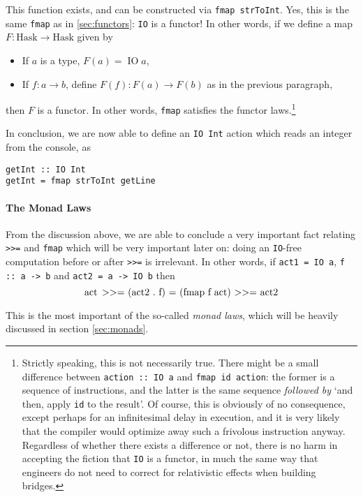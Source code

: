 \documentclass[11pt]{article}
\theoremstyle{nonumberplain}
\newcommand{\Hask}{\mathrm{Hask}}
\newcommand{\typecons}[1]{\mathop{\mathrm{#1}}}
\newcommand*\lsin{\lstinline}
\newcommand*\lsmath[1]{\text{\lstinline|#1|}}
\begin{document}
This function exists, and can be constructed via \lsin|fmap strToInt|. Yes, this is the same \lsin|fmap| as in \ref{sec:functors}: \lsin|IO| is a functor! In other words, if we define a map $F \colon \Hask \to \Hask$ given by
\begin{itemize}
\item If $a$ is a type, $F(a) = \typecons{IO} a$,
\item If $f \colon a \to b$, define $F(f) \colon F(a) \to F(b)$ as in the previous paragraph,
\end{itemize}
then $F$ is a functor. In other words, \lsin|fmap| satisfies the functor laws.\footnote{Strictly speaking, this is not necessarily true. There might be a small difference between \lsin|action :: IO a| and \lsin|fmap id action|: the former is a sequence of instructions, and the latter is the same sequence \emph{followed by} `and then, apply \lsin|id| to the result'. Of course, this is obviously of no consequence, except perhaps for an infinitesimal delay in execution, and it is very likely that the compiler would optimize away such a frivolous instruction anyway. Regardless of whether there exists a difference or not, there is no harm in accepting the fiction that \lsin|IO| is a functor, in much the same way that engineers do not need to correct for relativistic effects when building bridges.}

In conclusion, we are now able to define an \lsin|IO Int| action which reads an integer from the console, as
\begin{lstlisting}
getInt :: IO Int
getInt = fmap strToInt getLine
\end{lstlisting}

\paragraph{The Monad Laws}

From the discussion above, we are able to conclude a very important fact relating \lsin|>>=| and \lsin|fmap| which will be very important later on: doing an \lsin|IO|-free computation before or after \lsin|>>=| is irrelevant. In other words, if \lsin|act1 = IO a|, \lsin|f :: a -> b| and \lsin|act2 = a -> IO b| then
\begin{equation}
\lsmath{act >>= (act2 . f) = (fmap f act) >>= act2}
\end{equation}

This is the most important of the so-called \emph{monad laws}, which will be heavily discussed in section \ref{sec:monads}.
\end{document}
